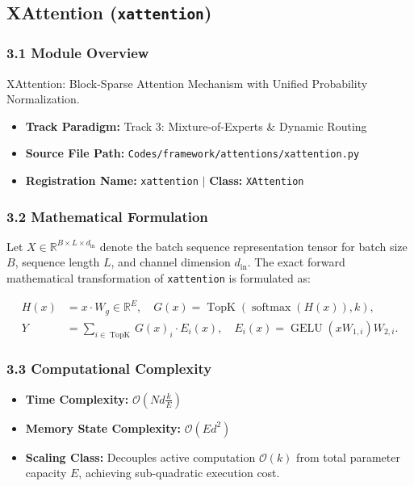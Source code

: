\subsection{XAttention (\texttt{xattention})}
\label{sec:app_module_xattention}

\subsubsection*{3.1 Module Overview}
XAttention: Block-Sparse Attention Mechanism with Unified Probability Normalization.
\begin{itemize}
    \item \textbf{Track Paradigm:} Track 3: Mixture-of-Experts & Dynamic Routing
    \item \textbf{Source File Path:} \texttt{Codes/framework/attentions/xattention.py}
    \item \textbf{Registration Name:} \texttt{xattention} $\mid$ \textbf{Class:} \texttt{XAttention}
\end{itemize}

\subsubsection*{3.2 Mathematical Formulation}
Let $X \in \mathbb{R}^{B \times L \times d_{\text{in}}}$ denote the batch sequence representation tensor for batch size $B$, sequence length $L$, and channel dimension $d_{\text{in}}$. The exact forward mathematical transformation of \texttt{xattention} is formulated as:

\begin{align}
H(x) &= x \cdot W_g \in \mathbb{R}^{E}, \quad G(x) = \operatorname{TopK}\left(\operatorname{softmax}(H(x)), k\right), \\
Y &= \sum_{i \in \operatorname{TopK}} G(x)_i \cdot E_i(x), \quad E_i(x) = \operatorname{GELU}(x W_{1, i}) W_{2, i}.
\end{align}


\subsubsection*{3.3 Computational Complexity}
\begin{itemize}
    \item \textbf{Time Complexity:} $\mathcal{O}(N d \frac{k}{E})$
    \item \textbf{Memory State Complexity:} $\mathcal{O}(E d^2)$
    \item \textbf{Scaling Class:} Decouples active computation $\mathcal{O}(k)$ from total parameter capacity $E$, achieving sub-quadratic execution cost.
\end{itemize}

